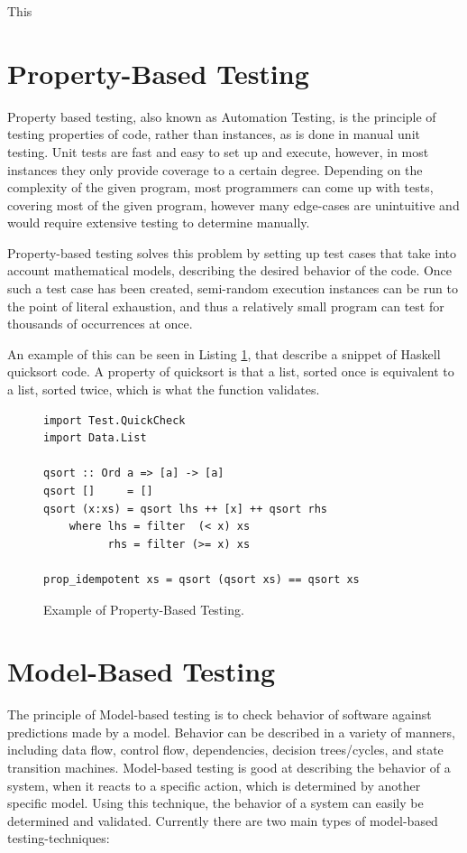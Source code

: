 This 

\section{Property-Based Testing}

Property based testing, also known as Automation Testing, is the principle of testing properties of code, rather than instances, as is done in manual unit testing. Unit tests are fast and easy to set up and execute, however, in most instances they only provide coverage to a certain degree. Depending on the complexity of the given program, most programmers can come up with tests, covering most of the given program, however many edge-cases are unintuitive and would require extensive testing to determine manually.

Property-based testing solves this problem by setting up test cases that take into account mathematical models, describing the desired behavior of the code. Once such a test case has been created, semi-random execution instances can be run to the point of literal exhaustion, and thus a relatively small program can test for thousands of occurrences at once.

An example of this can be seen in Listing \ref{fig:pbtEx}, that describe a snippet of Haskell quicksort code. A property of quicksort is that a list, sorted once is equivalent to a list, sorted twice, which is what the function  validates.
\begin{figure}
	\centering
	\begin{lstlisting}
import Test.QuickCheck
import Data.List

qsort :: Ord a => [a] -> [a]
qsort []     = []
qsort (x:xs) = qsort lhs ++ [x] ++ qsort rhs
    where lhs = filter  (< x) xs
          rhs = filter (>= x) xs

prop_idempotent xs = qsort (qsort xs) == qsort xs
	\end{lstlisting}
	\caption{Example of Property-Based Testing. \cite{realWorldHaskell11}}
	\label{fig:pbtEx}
\end{figure}

\section{Model-Based Testing}

The principle of Model-based testing is to check behavior of software against predictions made by a model. Behavior can be described in a variety of manners, including data flow, control flow, dependencies, decision trees/cycles, and state transition machines. Model-based testing is good at describing the behavior of a system, when it reacts to a specific action, which is determined by another specific model. Using this technique, the behavior of a system can easily be determined and validated. Currently there are two main types of model-based testing-techniques:

